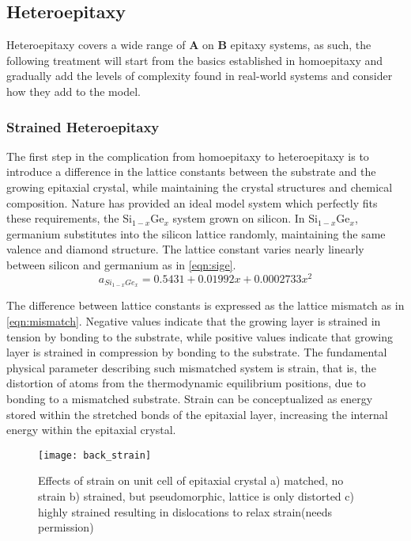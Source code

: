 \subsection{Heteroepitaxy}
Heteroepitaxy covers a wide range of \textbf{A} on \textbf{B} epitaxy systems, as such, the following treatment will start from the basics established in homoepitaxy and gradually add the levels of complexity found in real-world systems and consider how they add to the model.

\subsubsection{Strained Heteroepitaxy}
The first step in the complication from homoepitaxy to heteroepitaxy is to introduce a difference in the lattice constants between the substrate and the growing epitaxial crystal, while maintaining the crystal structures and chemical composition. Nature has provided an ideal model system which perfectly fits these requirements, the Si$_{1-x}$Ge$_x$ system grown on silicon. In Si$_{1-x}$Ge$_x$, germanium substitutes into the silicon lattice randomly, maintaining the same valence and diamond structure. The lattice constant varies nearly linearly between silicon and germanium as in \cref{eqn:sige}.
\begin{equation}
a_{Si_{1-x}Ge_x} = 0.5431 + 0.01992x + 0.0002733x^2 \label{eqn:sige}
\end{equation}

The difference between lattice constants is expressed as the lattice mismatch as in \cref{eqn:mismatch}. Negative values indicate that the growing layer is strained in tension by bonding to the substrate, while positive values indicate that growing layer is strained in compression by bonding to the substrate. The fundamental physical parameter describing such mismatched system is strain, that is, the distortion of atoms from the thermodynamic equilibrium positions, due to bonding to a mismatched substrate. Strain can be conceptualized as energy stored within the stretched bonds of the epitaxial layer, increasing the internal energy within the epitaxial crystal.
\begin{figure}
    \centering
    \texttt{[image: back\_strain]}
    \caption[Unit cell strain visualization]{\label{fig:back_strain}Effects of strain on unit cell of epitaxial crystal a) matched, no strain b) strained, but pseudomorphic, lattice is only distorted c) highly strained resulting in dislocations to relax strain\cite{ohring2001materials}(needs permission)}
\end{figure}

